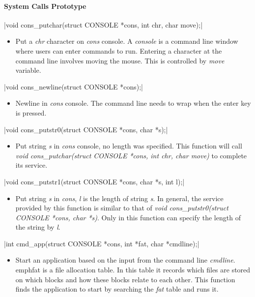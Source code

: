 \documentclass{swfcthesis}
\begin{document}
\paragraph{System Calls Prototype}

\csingle|void cons_putchar(struct CONSOLE *cons, int chr, char move);|
\begin{itemize}
\item Put a \emph{chr} character on \emph{cons} console. A \emph{console} is a command line
  window where users can enter commands to run. Entering a character at the command line
  involves moving the mouse. This is controlled by \emph{move} variable.
  
\end{itemize}

\csingle|void cons_newline(struct CONSOLE *cons);|
\begin{itemize}
\item Newline in \emph{cons} console. The command line needs to wrap when the enter key is
  pressed. 
  
\end{itemize}

\csingle|void cons_putstr0(struct CONSOLE *cons, char *s);|
\begin{itemize}
\item Put string \emph{s} in \emph{cons} console, no length was specified. This function
  will call \emph{void cons\_putchar(struct CONSOLE *cons, int chr, char move)} to
  complete its service. 
  
  
\end{itemize}

\csingle|void cons_putstr1(struct CONSOLE *cons, char *s, int l);|
\begin{itemize}
\item Put string \emph{s} in \emph{cons}, \emph{l} is the length of string
  \emph{s}. In general, the service provided by this function is similar to that of
  \emph{void cons\_putstr0(struct CONSOLE *cons, char *s)}. Only in this function can
  specify the length of the string by \emph{l}.
  
\end{itemize}

\csingle|int cmd_app(struct CONSOLE *cons, int *fat, char *cmdline);|
\begin{itemize}
\item Start an application based on the input from the command line
  \emph{cmdline}. emph{fat} is a file allocation
  table. In this table it records which files are stored on which blocks and how these
  blocks relate to each other. This function finds the application to start by searching
  the \emph{fat} table and runs it. 
  
  
\end{itemize}
\end{document}
